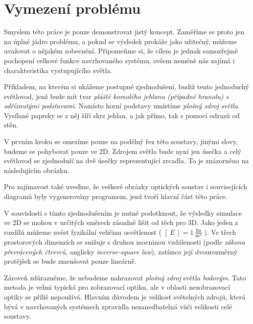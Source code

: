 \section{Vymezení problému}
\label{sec:vymezeniproblemu}

Smyslem této práce je pouze demonstrovat jistý koncept. Zaměříme se proto jen na úplné jádro problému, a pokud se výsledek prokáže jako užitečný, můžeme uvažovat o nějakém zobecnění. Připomeňme si, že cílem je jednak samozřejmě pochopení celkové funkce navrhovaného systému, ovšem neméně nás zajímá i charakteristika vystupujícího světla.

Příkladem, na kterém si ukážeme postupné zjednodušení, budiž tento jednoduchý světlovod, jenž bude mít tvar \emph{pláště komolého jehlanu (případně hranolu) s odříznutými podstavami}. Namísto horní podstavy umístíme \emph{plošný zdroj světla}. Vysílané paprsky se z něj šíří skrz jehlan, a jak přímo, tak s pomocí odrazů od stěn.

V prvním kroku se omezíme pouze na podélný řez této soustavy, jinými slovy, budeme se pohybovat pouze ve 2D. Zdrojem světla bude nyní jen úsečka a celý světlovod se zjednoduší na dvě úsečky reprezentující zrcadla. To je znázorněno na následujícím obrázku.

Pro zajímavost také uveďme, že veškeré obrázky optických soustav i souvisejících diagramů byly vygenerovány programem, jenž tvoří hlavní část této práce. 


V souvislosti s tímto zjednodušením je nutné podotknout, že výsledky simulace ve 2D se mohou v určitých směrech zásadně lišit od těch pro 3D. Jako jeden z rozdílů můžeme uvést fyzikální veličinu osvětlenost ( $ [\ E\ ] = 1 \ \mathrm{\frac{lm}{m^2}} $ ). Ve třech prostorových dimenzích se snižuje s druhou mocninou vzdálenosti (podle \emph{zákona převrácených čtverců}, anglicky \emph{inverse-square law}), zatímco její dvourozměrný protějšek se bude zmenšovat pouze lineárně.

Zároveň zdůrazněme, že nebudeme nahrazovat \emph{plošný zdroj} světla \emph{bodovým}. Tato metoda je velmi typická pro zobrazovací optiku, ale v oblasti nezobrazovací optiky se příliš nepoužívá. Hlavním důvodem je velikost světelných zdrojů, která bývá v navrhovaných systémech zpravidla nezanedbatelná vůči velikosti celé soustavy.

